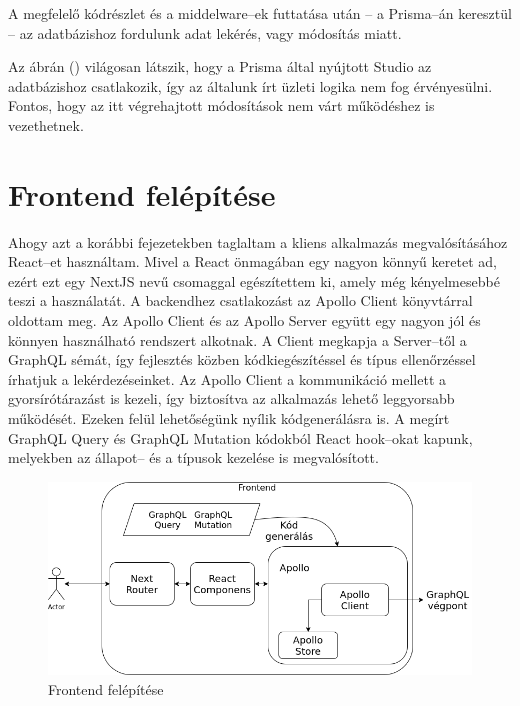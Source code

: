 A megfelelő kódrészlet és a middelware–ek futtatása után – a Prisma–án keresztül – az adatbázishoz fordulunk adat lekérés, vagy módosítás miatt.

Az ábrán () világosan látszik, hogy a Prisma által nyújtott Studio az adatbázishoz csatlakozik, így az általunk írt üzleti logika nem fog érvényesülni.
Fontos, hogy az itt végrehajtott módosítások nem várt működéshez is vezethetnek.


\section{Frontend felépítése}

Ahogy azt a korábbi fejezetekben taglaltam a kliens alkalmazás megvalósításához React–et használtam. Mivel a React önmagában egy nagyon könnyű keretet ad, ezért ezt egy NextJS nevű csomaggal egészítettem ki, amely még kényelmesebbé teszi a használatát.
A backendhez csatlakozást az Apollo Client könyvtárral oldottam meg. 
Az Apollo Client és az Apollo Server együtt egy nagyon jól és könnyen használható rendszert alkotnak.
A Client megkapja a Server–től a GraphQL sémát, így fejlesztés közben kódkiegészítéssel és típus ellenőrzéssel írhatjuk a lekérdezéseinket.
Az Apollo Client a kommunikáció mellett a gyorsírótárazást is kezeli, így biztosítva az alkalmazás lehető leggyorsabb működését.
Ezeken felül lehetőségünk nyílik kódgenerálásra is.
A megírt GraphQL Query és GraphQL Mutation kódokból React hook–okat kapunk, melyekben az állapot– és a típusok kezelése is megvalósított.

\begin{figure}[!ht]
  \centering
  \includegraphics[width=150mm, keepaspectratio]{figures/frontend.png}
  \caption{Frontend felépítése}
  \label{fig:frontend}
\end{figure}

